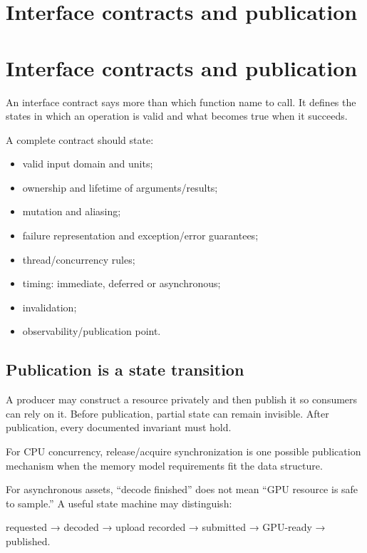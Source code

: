 \hypertarget{appendix-fdae7ff0a23f}{}
\section*{Interface contracts and publication}
\section{Interface contracts and publication}\label{interface-contracts-and-publication}

An interface contract says more than which function name to call. It defines the states in which an operation is valid and what becomes true when it succeeds.

A complete contract should state:

\begin{itemize}
\tightlist
\item
  valid input domain and units;
\item
  ownership and lifetime of arguments/results;
\item
  mutation and aliasing;
\item
  failure representation and exception/error guarantees;
\item
  thread/concurrency rules;
\item
  timing: immediate, deferred or asynchronous;
\item
  invalidation;
\item
  observability/publication point.
\end{itemize}

\subsection{Publication is a state transition}\label{publication-is-a-state-transition}

A producer may construct a resource privately and then publish it so consumers can rely on it. Before publication, partial state can remain invisible. After publication, every documented invariant must hold.

For CPU concurrency, release/acquire synchronization is one possible publication mechanism when the memory model requirements fit the data structure.

For asynchronous assets, ``decode finished'' does not mean ``GPU resource is safe to sample.'' A useful state machine may distinguish:

requested → decoded → upload recorded → submitted → GPU-ready → published.

